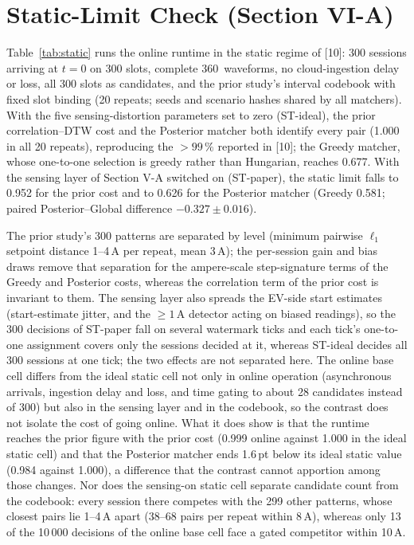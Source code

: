 \documentclass[10pt]{article}
\newcommand{\sq}{\,\text{s}}
\begin{document}
\section{Static-Limit Check (Section VI-A)}

Table~\ref{tab:static} runs the online runtime in the static regime of [10]: 300 sessions arriving at $t = 0$ on 300 slots, complete 360\sq{} waveforms, no cloud-ingestion delay or loss, all 300 slots as candidates, and the prior study's interval codebook with fixed slot binding (20 repeats; seeds and scenario hashes shared by all matchers). With the five sensing-distortion parameters set to zero (ST-ideal), the prior correlation--DTW cost and the Posterior matcher both identify every pair (1.000 in all 20 repeats), reproducing the $>99\,\%$ reported in [10]; the Greedy matcher, whose one-to-one selection is greedy rather than Hungarian, reaches 0.677. With the sensing layer of Section V-A switched on (ST-paper), the static limit falls to 0.952 for the prior cost and to 0.626 for the Posterior matcher (Greedy 0.581; paired Posterior--Global difference $-0.327 \pm 0.016$).

The prior study's 300 patterns are separated by level (minimum pairwise $\ell_1$ setpoint distance 1--4\,A per repeat, mean 3\,A); the per-session gain and bias draws remove that separation for the ampere-scale step-signature terms of the Greedy and Posterior costs, whereas the correlation term of the prior cost is invariant to them. The sensing layer also spreads the EV-side start estimates (start-estimate jitter, and the $\geq 1$\,A detector acting on biased readings), so the 300 decisions of ST-paper fall on several watermark ticks and each tick's one-to-one assignment covers only the sessions decided at it, whereas ST-ideal decides all 300 sessions at one tick; the two effects are not separated here. The online base cell differs from the ideal static cell not only in online operation (asynchronous arrivals, ingestion delay and loss, and time gating to about 28 candidates instead of 300) but also in the sensing layer and in the codebook, so the contrast does not isolate the cost of going online. What it does show is that the runtime reaches the prior figure with the prior cost (0.999 online against 1.000 in the ideal static cell) and that the Posterior matcher ends 1.6\,pt below its ideal static value (0.984 against 1.000), a difference that the contrast cannot apportion among those changes. Nor does the sensing-on static cell separate candidate count from the codebook: every session there competes with the 299 other patterns, whose closest pairs lie 1--4\,A apart (38--68 pairs per repeat within 8\,A), whereas only 13 of the 10\,000 decisions of the online base cell face a gated competitor within 10\,A.
\end{document}
